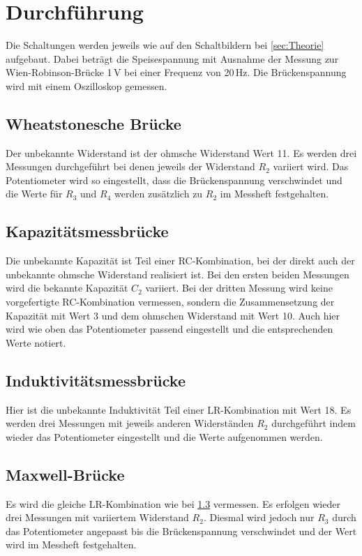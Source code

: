 \section{Durchführung}
\label{sec:Durchführung}

Die Schaltungen werden jeweils wie auf den Schaltbildern bei 
\ref{sec:Theorie} aufgebaut. Dabei beträgt die
Speisespannung mit Ausnahme der Messung
zur Wien-Robinson-Brücke 1\,V bei einer Frequenz von 20\,Hz. Die Brückenspannung wird
mit einem Oszilloskop gemessen.
\subsection{Wheatstonesche Brücke}
Der unbekannte Widerstand ist der ohmsche Widerstand Wert 11.
Es werden drei Messungen durchgeführt bei denen jeweils der Widerstand $R_2$
variiert wird. Das Potentiometer wird so eingestellt,
dass die Brückenspannung verschwindet und die Werte
für $R_3$ und $R_4$ werden zusätzlich zu $R_2$ im Messheft festgehalten.
\subsection{Kapazitätsmessbrücke}
Die unbekannte Kapazität ist Teil einer RC-Kombination,
bei der direkt auch der unbekannte ohmsche Widerstand realisiert ist.
Bei den ersten beiden Messungen wird die bekannte Kapazität $C_2$ variiert.
Bei der dritten Messung wird keine vorgefertigte RC-Kombination vermessen, sondern die 
Zusammensetzung der Kapazität mit Wert 3 und dem ohmschen Widerstand mit Wert 10.
Auch hier wird wie oben das Potentiometer passend eingestellt und die
entsprechenden Werte notiert.
\subsection{Induktivitätsmessbrücke}
\label{sec:Indu}
Hier ist die unbekannte Induktivität Teil einer LR-Kombination
mit Wert 18. Es werden drei Messungen mit jeweils anderen Widerständen $R_2$
durchgeführt indem wieder das Potentiometer eingestellt und die Werte aufgenommen werden.
\subsection{Maxwell-Brücke}
Es wird die gleiche LR-Kombination wie bei \ref{sec:Indu} vermessen.
Es erfolgen wieder drei Messungen mit variiertem Widerstand $R_2$. Diesmal
wird jedoch nur $R_3$ durch das Potentiometer angepasst bis die
Brückenspannung verschwindet und der Wert wird im Messheft festgehalten.

